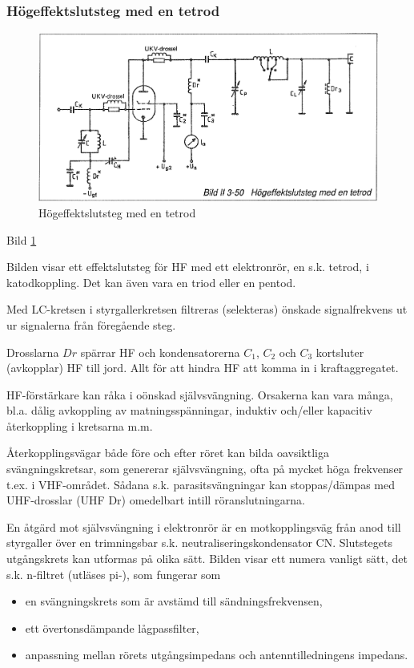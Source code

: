 \begin{rev-raderas}
\subsubsection{Högeffektslutsteg med en tetrod}

\begin{figure}
\includegraphics[width=\textwidth]{images/bild_2_3-50}
\caption{Högeffektslutsteg med en tetrod}
\label{fig:BildII3-50}
\end{figure}

Bild \ref{fig:BildII3-50}

Bilden visar ett effektslutsteg för HF med ett elektronrör, en
s.k. tetrod, i katodkoppling.  Det kan även vara en triod eller en
pentod.

Med LC-kretsen i styrgallerkretsen filtreras (selekteras) önskade
signalfrekvens ut ur signalerna från föregående steg.

Drosslarna \(Dr\) spärrar HF och kondensatorerna \(C_1\), \(C_2\) och
\(C_3\) kortsluter (avkopplar) HF till jord. Allt för att hindra HF
att komma in i kraftaggregatet.

HF-förstärkare kan råka i oönskad självsvängning. Orsakerna kan vara
många, bl.a.  dålig avkoppling av matningsspänningar, induktiv
och/eller kapacitiv återkoppling i kretsarna m.m.

Återkopplingsvägar både före och efter röret kan bilda oavsiktliga
svängningskretsar, som genererar självsvängning, ofta på mycket höga
frekvenser t.ex. i VHF-området. Sådana s.k. parasitsvängningar kan
stoppas/dämpas med UHF-drosslar (UHF Dr) omedelbart intill
röranslutningarna.

En åtgärd mot självsvängning i elektronrör är en motkopplingsväg från
anod till styrgaller över en trimningsbar
s.k. neutraliseringskondensator CN. Slutstegets utgångskrets kan
utformas på olika sätt. Bilden visar ett numera vanligt sätt, det
s.k. n-filtret (utläses pi-), som fungerar som
\begin{itemize}
\item en svängningskrets som är avstämd till sändningsfrekvensen,
\item ett övertonsdämpande lågpassfilter,
\item anpassning mellan rörets utgångsimpedans och antenntilledningens impedans.
\end{itemize}
\end{rev-raderas}


